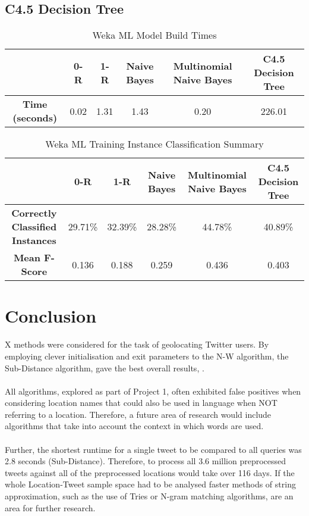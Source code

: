 \documentclass[11pt]{article}
\begin{document}
\subsection{C4.5 Decision Tree}

\begin{table} [ht]
\caption{Weka ML Model Build Times}
\centering
	\begin{tabular}{| c | c | c | c | c | c |}
	\hline
	 & \textbf{0-R} & \textbf{1-R} & \textbf{Naive Bayes} & \textbf{Multinomial Naive Bayes} &\textbf{C4.5 Decision Tree}  \\
	\hline
	\textbf{Time (seconds)} & 0.02 & 1.31 & 1.43 & 0.20 & 226.01\\
	\hline
	\end{tabular}
\label{table:run-table}
\end{table}

\begin{table} [th]
\caption{Weka ML Training Instance Classification Summary}
\centering
	\begin{tabular}{| c | c | c | c | c | c |}
	\hline
	 & \textbf{0-R} & \textbf{1-R} & \textbf{Naive Bayes} & \textbf{Multinomial Naive Bayes} &\textbf{C4.5 Decision Tree}  \\
	\hline
	\textbf{Correctly Classified Instances} & 29.71\% & 32.39\% & 28.28\% & 44.78\% & 40.89\%\\
	\hline
	\textbf{Mean F-Score} & 0.136 & 0.188 & 0.259 & 0.436 & 0.403 \\
	\hline
	\end{tabular}
\label{table:eval-table}
\end{table}

\section{Conclusion}

X methods were considered for the task of geolocating Twitter users. By employing clever initialisation and exit parameters to the N-W algorithm, the Sub-Distance algorithm, gave the best overall results, .\\\\
All algorithms, explored as part of Project 1, often exhibited false positives when considering location names that could also be used in language when NOT referring to a location. Therefore, a future area of research would include algorithms that take into account the context in which words are used.\\\\
Further, the shortest runtime for a single tweet to be compared to all queries was 2.8 seconds (Sub-Distance). Therefore, to process all 3.6 million preprocessed tweets against all of the preprocessed locations would take over 116 days. If the whole Location-Tweet sample space had to be analysed faster methods of string approximation, such as the use of Tries or N-gram matching algorithms, are an area for further research. 



\end{document}
